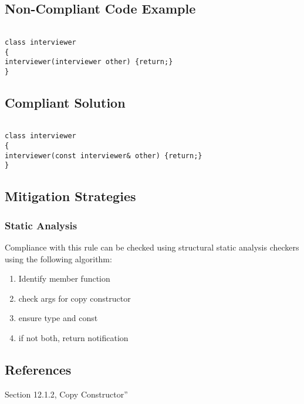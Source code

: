 \subsection{Non-Compliant Code Example}


\begin{verbatim}

class interviewer
{
interviewer(interviewer other) {return;}
}

\end{verbatim}

\subsection{Compliant Solution}


\begin{verbatim}

class interviewer
{
interviewer(const interviewer& other) {return;}
}

\end{verbatim}

\subsection{Mitigation Strategies}
\subsubsection{Static Analysis} 

Compliance with this rule can be checked using structural static analysis checkers using the following algorithm:

\begin{enumerate}
\item Identify member function
\item check args for copy constructor
\item ensure type and const
\item if not both, return notification
\end{enumerate}

\subsection{References}

 Section 12.1.2, Copy Constructor''
